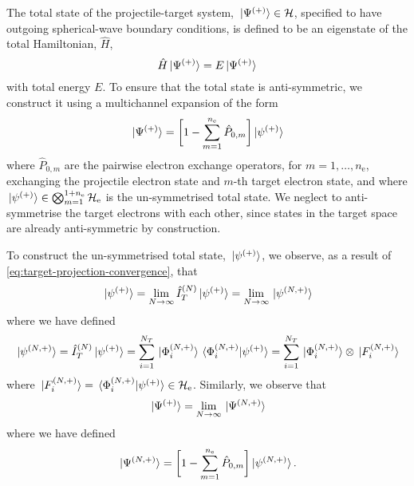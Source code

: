 \documentclass[draft]{article}
\begin{document}
The total state of the projectile-target system,
$\ket*{\Psi^{(+)}} \in \mathcal{H}$, specified to have outgoing
spherical-wave boundary conditions, is defined to be an eigenstate of the total
Hamiltonian, $\hat{H}$,
\begin{equation}
  \label{eq:total-state}
  \hat{H}
  \ket*{\Psi^{\lr{+}}}
  =
  E
  \ket*{\Psi^{\lr{+}}}
\end{equation}
with total energy $E$.
To ensure that the total state is anti-symmetric, we construct it using a
multichannel expansion of the form
\begin{equation}
  \label{eq:total-state-multichannel}
  \ket*{\Psi^{\lr{+}}}
  =
  \lrsq[\bigg]
  {
    1
    -
    \sum_{m = 1}^{n_{\mathrm{e}}}
    \hat{P}_{0, m}
  }
  \ket*{\psi^{\lr{+}}}
\end{equation}
where $\hat{P}_{0, m}$ are the pairwise electron exchange operators, for
$m = 1, \dotsc, n_{\mathrm{e}}$, exchanging the projectile electron state and
$m$-th target electron state, and where
$\ket*{\psi^{(+)}} \in
\bigotimes_{m = 1}^{1 + n_{\mathrm{e}}} \mathcal{H}_{\mathrm{e}}$ is the
un-symmetrised total state.
We neglect to anti-symmetrise the target electrons with each other, since states
in the target space are already anti-symmetric by construction.

To construct the un-symmetrised total state, $\ket*{\psi^{(+)}}$, we
observe, as a result of \autoref{eq:target-projection-convergence}, that
\begin{equation}
  \label{eq:total-state-un-symmetrised-convergence}
  \ket*{\psi^{\lr{+}}}
  =
  \lim_{N \to \infty}
  \hat{I}_{T}^{\lr{N}}
  \ket*{\psi^{\lr{+}}}
  =
  \lim_{N \to \infty}
  \ket*{\psi^{\lr{N, +}}}
\end{equation}
where we have defined
\begin{equation}
  \label{eq:total-state-un-symmetrised-n}
  \ket*{\psi^{\lr{N, +}}}
  =
  \hat{I}_{T}^{\lr{N}}
  \ket*{\psi^{\lr{+}}}
  =
  \sum_{i = 1}^{N_{T}}
  \ket*{\Phi_{i}^{\lr{N, +}}}
  \bra*{\Phi_{i}^{\lr{N, +}}}
  \ket*{\psi^{\lr{+}}}
  =
  \sum_{i = 1}^{N_{T}}
  \ket*{\Phi_{i}^{\lr{N, +}}}
  \otimes
  \ket*{F_{i}^{\lr{N, +}}}
\end{equation}
where $\ket*{F_{i}^{(N, +)}}
= \bra*{\Phi_{i}^{(N, +)}}\ket*{\psi^{(+)}}
\in \mathcal{H}_{\mathrm{e}}$.
Similarly, we observe that
\begin{equation}
  \label{eq:total-state-multichannel-convergence}
  \ket*{\Psi^{\lr{+}}}
  =
  \lim_{N \to \infty}
  \ket*{\Psi^{\lr{N, +}}}
\end{equation}
where we have defined
\begin{equation}
  \label{eq:total-state-multichannel-n}
  \ket*{\Psi^{\lr{N, +}}}
  =
  \lrsq[\bigg]
  {
    1
    -
    \sum_{m = 1}^{n_{\mathrm{e}}}
    \hat{P}_{0, m}
  }
  \ket*{\psi^{\lr{N, +}}}
  .
\end{equation}
\end{document}
